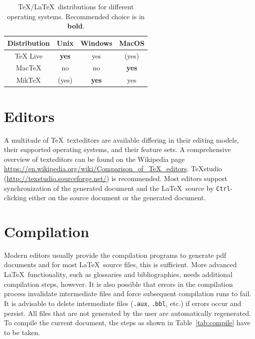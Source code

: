 \begin{table}
  \centering
  \begin{tabular}{cccc}
    \toprule
    Distribution & Unix         & Windows      & MacOS        \\
    \midrule
    TeX Live     & \textbf{yes} & yes          & (yes)        \\
    MacTeX       & no           & no           & \textbf{yes} \\
    MikTeX       & (yes)        & \textbf{yes} & yes          \\
    \bottomrule
  \end{tabular}
  \caption{\TeX/\LaTeX\ distributions for different operating systems. Recommended choice is in \textbf{bold}.}
  \label{tab:distrib} %
\end{table}

\section{Editors}

A multitude of \TeX\ \glspl{texteditor} are available differing in their editing models, their supported operating systems, and their feature sets.
A comprehensive overview of \glspl{texteditor} can be found on the Wikipedia page \url{https://en.wikipedia.org/wiki/Comparison_of_TeX_editors}.
TeXstudio (\url{http://texstudio.sourceforge.net/}) is recommended.
Most editors support synchronization of the generated document and the \LaTeX\ source by \verb|Ctrl|-clicking either on the source document or the generated document.

\section{Compilation}

Modern editors usually provide the compilation programs to generate \gls{pdf} documents and for most \LaTeX\ source files, this is sufficient.
More advanced \LaTeX\ functionality, such as glossaries and bibliographies, needs additional compilation steps, however.
It is also possible that errors in the compilation process invalidate intermediate files and force subsequent compilation runs to fail.
It is advisable to delete intermediate files (\verb|.aux|, \verb|.bbl|, etc.) if errors occur and persist.
All files that are not generated by the user are automatically regenerated.
To compile the current document, the steps as shown in Table~\ref{tab:compile} have to be taken.


